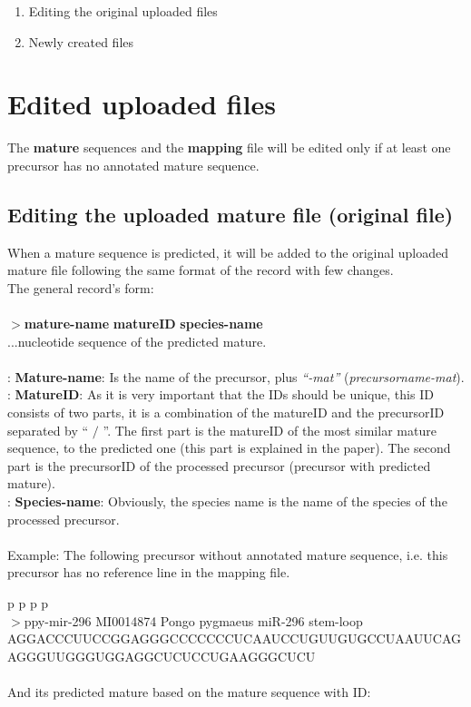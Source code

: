 \documentclass[a4paper,20pt]{report}
\newcommand*{\rom}[1]{\uppercase\expandafter{\romannumeral #1\relax}}
\begin{document}
\begin{enumerate}
 \item Editing the original uploaded files
 \item Newly created files
\end{enumerate}
\section{Edited uploaded files}
\noindent
The \textbf{mature} sequences  and the \textbf{mapping} file will be edited only if at least one precursor has no annotated mature sequence.
\subsection{Editing the uploaded mature file (original file)}
\label{subsec:editmat}
\noindent
When a mature sequence is predicted, it will be added to the original uploaded mature file following the same format of the record with few changes.\\
The general record's form:\\

\rom{1}\hspace{2.2cm}\rom{2}\hspace{1.8cm}\rom{3}\\
$>$\textbf{mature-name} \textbf{matureID} \textbf{species-name}\\
...nucleotide sequence of the predicted mature.\\\\
\rom{1}: \textbf{Mature-name}: Is the name of the precursor, plus \textit{``-mat''} (\textit{precursorname-mat}).\\
\rom{2}: \textbf{MatureID}: As it is very important that the IDs should be unique, this ID consists of two parts, 
it is a combination of the matureID and the precursorID separated by `` $/$ ''. The first part is the matureID of the most 
similar mature sequence, to the predicted one (this part is explained in the paper). 
The second part is the precursorID of the processed precursor (precursor with predicted mature).\\
\rom{3}: \textbf{Species-name}: Obviously, the species name is the name of the species of the processed precursor.\\\\
Example:
The following precursor without annotated mature sequence, i.e. this precursor has no reference line in the mapping file.

\rom{1}p \hspace{1.5 cm}\rom{2}p \hspace{1.3cm}\rom{3}p \hspace{1.8cm}\rom{4}p\\
$>$ppy-mir-296 MI0014874 Pongo pygmaeus miR-296 stem-loop\\
AGGACCCUUCCGGAGGGCCCCCCCUCAAUCCUGUUGUGCCUAAUUCAGAGGGUUGGGUGGAGGCUCUCCUGAAGGGCUCU\\\\
And its predicted mature based on the mature sequence with ID:
\end{document}
